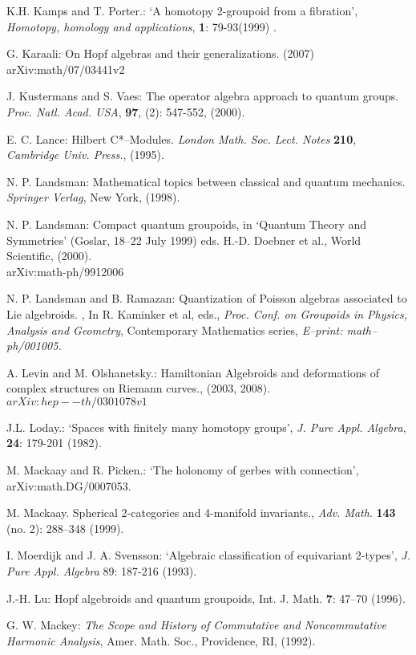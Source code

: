 \documentclass[12pt]{article}
\theoremstyle{plain}
\theoremstyle{definition}
\numberwithin{equation}{section}
\newcommand{\<}{{\langle}}
\begin{document}
\begin{thebibliography}{99}
K.H. Kamps and T. Porter.: `A homotopy 2-groupoid from a fibration', \textit{Homotopy, homology and applications}, \textbf{1}: 79-93(1999) .

G. Karaali: On Hopf algebras and their generalizations. (2007)
\\arXiv:math/07/03441v2


J. Kustermans and S. Vaes: The operator algebra approach to quantum groups.
\textit{Proc. Natl. Acad. USA}, \textbf{97}, (2): 547-552, (2000).

E. C. Lance: Hilbert C*--Modules. \emph{London Math. Soc. Lect.
Notes} \textbf{210}, \emph{Cambridge Univ. Press.}, (1995).

N. P. Landsman: Mathematical topics between classical and quantum
mechanics. \emph{Springer Verlag}, New York, (1998).

N. P. Landsman: Compact quantum groupoids, in `Quantum Theory and
Symmetries' (Goslar, 18--22 July 1999) eds. H.-D. Doebner et al.,
World Scientific, (2000).
\\arXiv:math-ph/9912006


N. P. Landsman and B. Ramazan: Quantization of Poisson algebras associated to Lie algebroids. , In R. Kaminker et al, eds., \emph{Proc. Conf. on Groupoids in Physics, Analysis and Geometry}, Contemporary Mathematics series, \emph{E--print: math--ph/001005.}

A. Levin and M. Olshanetsky.: Hamiltonian Algebroids and deformations
of complex structures on Riemann curves., (2003, 2008). $arXiv:hep--th/0301078v1$


J.L. Loday.: `Spaces with finitely many homotopy groups', \textit{J. Pure Appl. Algebra}, \textbf{24}: 179-201 (1982).

M. Mackaay and R. Picken.: `The holonomy of gerbes with connection', arXiv:math.DG/0007053.

M. Mackaay. Spherical 2-categories and 4-manifold invariants., \textit{Adv. Math}. \textbf{143}
(no. 2): 288--348 (1999).
 
I. Moerdijk and J. A. Svensson: `Algebraic classification of equivariant 2-types', \textit{J. Pure Appl. Algebra} 89: 187-216 (1993).

J.-H. Lu: Hopf algebroids and quantum groupoids, Int. J. Math. \textbf{7}: 47--70 (1996).

G. W. Mackey: \emph{The Scope and History of Commutative and Noncommutative Harmonic Analysis}, Amer. Math. Soc., Providence, RI, (1992).


\end{thebibliography}
\end{document}
